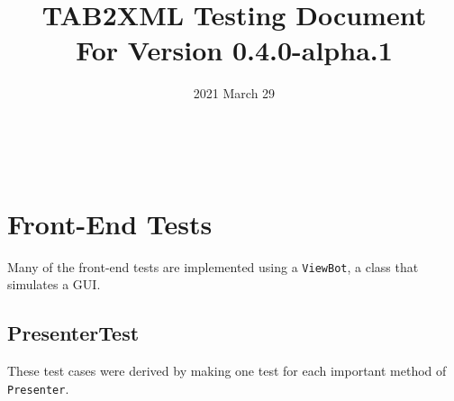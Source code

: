 \documentclass[11pt]{article}
\date{2021 March 29}
\title{TAB2XML Testing Document\\\medskip
\large For Version 0.4.0-alpha.1}
\begin{document}
\maketitle
\tableofcontents

\newpage\\
\section{Front-End Tests}
\label{sec:orgab76020}
Many of the front-end tests are implemented using a \texttt{ViewBot}, a class that simulates a GUI.\\
\subsection{PresenterTest}
\label{sec:org272ab14}
These test cases were derived by making one test for each important method of \texttt{Presenter}.\\
\end{document}
